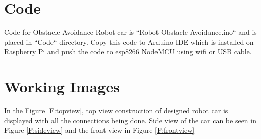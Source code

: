 \documentclass[sigconf]{acmart}
\begin{document}
\section{Code}
Code for Obstacle Avoidance Robot car is ``Robot-Obstacle-Avoidance.ino`` and is placed in ``Code`` directory. Copy this code to Arduino IDE which is installed on Raspberry Pi and push the code to esp8266 NodeMCU using wifi or USB cable.

\section{Working Images}
In the Figure \ref{F:topview}, top view construction of designed robot car is displayed with all the connections being done. Side view of the car can be seen in Figure \ref{F:sideview} and the front view in Figure \ref{F:frontview}
\end{document}
